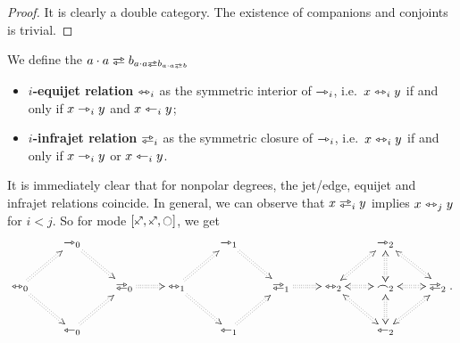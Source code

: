 \documentclass[a4paper]{article}
\begin{document}
\begin{proof}
	It is clearly a double category. The existence of companions and conjoints is trivial.
\end{proof}
\begin{definition}
	We define the $a \cdot a \infrajet b_{a \cdot a \infrajet b_{a \cdot a \infrajet b}}$
	\begin{itemize}
		\item \textbf{$i$-equijet relation} $\leftrightarrowtriangle_i$ as the symmetric interior of $\rightarrowtriangle_i$, i.e.\ $x \leftrightarrowtriangle_i y$ if and only if $x \rightarrowtriangle_i y$ and $x \leftarrowtriangle_i y$;
		\item \textbf{$i$-infrajet relation} $\infrajet_i$ as the symmetric closure of $\rightarrowtriangle_i$, i.e.\ $x \leftrightarrowtriangle_i y$ if and only if $x \rightarrowtriangle_i y$ or $x \leftarrowtriangle_i y$.
	\end{itemize}
\end{definition}
It is immediately clear that for nonpolar degrees, the jet/edge, equijet and infrajet relations coincide.
In general, we can observe that $x \infrajet_i y$ implies $x \leftrightarrowtriangle_j y$ for $i < j$.
So for mode $[\ypolar, \ypolar, \npolar]$, we get
\[
\xymatrix{
	& 
	\jet_0
		\ar@{:>}[rd]
	&&& 
	\jet_1 
		\ar@{:>}[rd]
	&&& 
	\jet_2 
		\ar@{<:>}[rd]
	\\
	\equijet_0
		\ar@{:>}[ru]
		\ar@{:>}[rd]
	&&
	\infrajet_0
		\ar@{:>}[r]
	&
	\equijet_1
		\ar@{:>}[ru]
		\ar@{:>}[rd]
	&&
	\infrajet_1
		\ar@{:>}[r]
	&
	\equijet_2
		\ar@{<:>}[ru]
		\ar@{<:>}[rd]
	&
	\edge_2
		\ar@{<:>}[l]
		\ar@{<:>}[u]
		\ar@{<:>}[r]
		\ar@{<:>}[d]
	&
	\infrajet_2.
	\\
	& 
	\tej_0 
		\ar@{:>}[ru]
	&&& 
	\tej_1 
		\ar@{:>}[ru]
	&&& 
	\tej_2 
		\ar@{<:>}[ru]
}
\]
\end{document}
